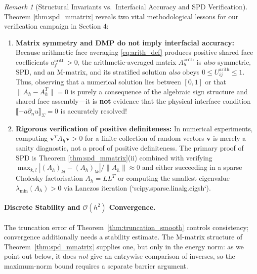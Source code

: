 \documentclass[11pt,a4paper]{article}
\theoremstyle{definition}
\theoremstyle{remark}
\newtheorem{remark}[theorem]{Remark}
\begin{document}
\begin{remark}[Structural Invariants vs.\ Interfacial Accuracy and SPD Verification]
\label{rem:symmetry_vs_accuracy}
Theorem \ref{thm:spd_mmatrix} reveals two vital methodological lessons for our verification campaign in Section 4:
\begin{enumerate}[label=(\arabic*), leftmargin=2em, itemsep=2pt]
    \item \textbf{Matrix symmetry and DMP do not imply interfacial accuracy:} Because arithmetic face averaging \eqref{eq:arith_def} produces positive shared face coefficients $a_f^{\text{arith}} > 0$, the arithmetic-averaged matrix $A_h^{\text{arith}}$ is \emph{also} symmetric, SPD, and an M-matrix, and its stratified solution \emph{also} obeys $0 \le U_{ij}^{\text{arith}} \le 1$. Thus, observing that a numerical solution lies between $[0,1]$ or that $\|A_h - A_h^T\| = 0$ is purely a consequence of the algebraic sign structure and shared face assembly---it is \textbf{not} evidence that the physical interface condition $\llbracket -a\partial_n u \rrbracket_\Sigma = 0$ is accurately resolved!
    \item \textbf{Rigorous verification of positive definiteness:} In numerical experiments, computing $\bm{v}^T A_h \bm{v} > 0$ for a finite collection of random vectors $\bm{v}$ is merely a sanity diagnostic, not a proof of positive definiteness. The primary proof of SPD is Theorem \ref{thm:spd_mmatrix}(ii) combined with verifying $\max_{k,l}|(A_h)_{kl} - (A_h)_{lk}| / \|A_h\| \approx 0$ and either succeeding in a sparse Cholesky factorisation $A_h = L L^T$ or computing the smallest eigenvalue $\lambda_{\min}(A_h) > 0$ via Lanczos iteration (`scipy.sparse.linalg.eigsh`).
\end{enumerate}
\end{remark}

\paragraph{Discrete Stability and $\mathcal{O}(h^2)$ Convergence.}
The truncation error of Theorem~\ref{thm:truncation_smooth} controls consistency; convergence additionally needs a stability estimate. The M-matrix structure of Theorem~\ref{thm:spd_mmatrix} supplies one, but only in the energy norm: as we point out below, it does \emph{not} give an entrywise comparison of inverses, so the maximum-norm bound requires a separate barrier argument.
\end{document}
